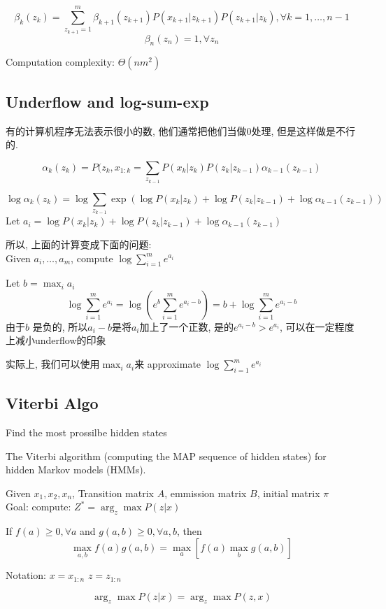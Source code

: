 \documentclass{article}
\begin{document}
$$ \beta_k(z_k) = \sum_{z_{k+1} = 1}^m \beta_{k+1}(z_{k+1}) P(x_{k+1}| z_{k+1}) P(z_{k+1}|z_k), \forall k = 1, \ldots, n-1 $$
$$\beta_n(z_n) = 1, \forall z_n$$

Computation complexity: $\Theta(n m^2)$

\subsection{Underflow and log-sum-exp}
有的计算机程序无法表示很小的数, 他们通常把他们当做$0$处理, 但是这样做是不行的.

$$\alpha_k(z_k) = P(z_k, x_{1:k} = \sum_{z_{k-1}} P(x_k | z_k)P(z_k|z_{k-1}) \alpha_{k-1}(z_{k-1})$$

$$\log \alpha_k(z_k) = \log \sum_{z_{k-1}} \exp(\log P(x_k | z_k) + \log P(z_k|z_{k-1}) + \log \alpha_{k-1}(z_{k-1}))$$
Let $a_i = \log P(x_k | z_k) + \log P(z_k|z_{k-1}) + \log \alpha_{k-1}(z_{k-1})$

\noindent
所以, 上面的计算变成下面的问题:\\
Given $a_i, \ldots, a_m$, compute $\log \sum_{i=1}^m e^{a_i}$

Let $b = \max_i a_i$
$$
\log \sum_{i=1}^m e^{a_i}
= \log (e^b \sum_{i=1}^m e^{a_i - b})
= b + \log \sum_{i=1}^m e^{a_i - b}
$$
由于$b$ 是负的, 所以$a_i -b$是将$a_i$加上了一个正数, 是的$e^{a_i- b} > e^{a_i}$, 可以在一定程度上减小underflow的印象

实际上, 我们可以使用$\max_i a_i$来 approximate $\log \sum_{i=1}^m e^{a_i}$

\subsection{Viterbi Algo}
Find the most prossilbe hidden states

The Viterbi algorithm (computing the MAP sequence of hidden states) for hidden Markov models (HMMs).

\noindent
Given $x_1, x_2, x_n$, Transition matrix $A$, emmission matrix $B$, initial matrix $\pi$\\
Goal: compute: $Z^* =\arg_z \max P(z|x)$

\begin{remark}
If $f(a) \geq 0, \forall a$ and $g(a,b) \geq 0, \forall a,b$, then
$$\max_{a,b} f(a)g(a,b) = \max_a [f(a) \max_b g(a,b)]$$
\end{remark}

Notation: 
$x = x_{1:n}$
$z = z_{1:n}$

$$\arg_z \max P(z|x) = \arg_z \max P(z,x)$$
\end{document}
